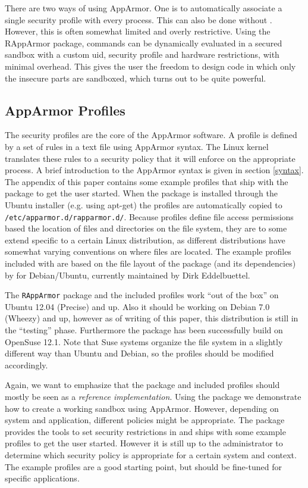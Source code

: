 \documentclass[article]{jss}
\begin{document}
There are two ways of using AppArmor. One is to automatically associate a
single security profile with every  process. This can also be done
without . However, this is often somewhat limited and overly
restrictive. Using the RAppArmor package,  commands can be
dynamically evaluated in a secured sandbox with a custom uid, security profile and hardware restrictions,
with minimal overhead. This gives the user the freedom to design code in which
only the insecure parts are sandboxed, which turns out to be quite powerful.

\subsection{AppArmor Profiles}

The security profiles are the core of the AppArmor software. A profile is
defined by a set of rules in a text file using AppArmor syntax. The Linux
kernel translates these rules to a security policy that it will enforce on the
appropriate process. A brief introduction to the AppArmor syntax is given in
section \ref{syntax}. The appendix of this paper contains some example
profiles that ship with the  package to get the user started.
When the package is installed through the Ubuntu installer (e.g. using apt-get)
the profiles are automatically copied to \texttt{/etc/apparmor.d/rapparmor.d/}.
Because profiles define file access permissions based the location of files and
directories on the file system, they are to some extend specific to a certain
Linux distribution, as different distributions have somewhat varying conventions
on where files are located. The example profiles included with 
are based on the file layout of the  package (and its dependencies)
by \cite{batesusing} for Debian/Ubuntu, currently maintained by Dirk Eddelbuettel.

The \texttt{RAppArmor} package and the included profiles work ``out of the
box'' on Ubuntu 12.04 (Precise) and up. Also it should be working on Debian
7.0 (Wheezy) and up, however as of writing of this paper, this distribution is
still in the ``testing'' phase. Furthermore the package has been successfully
build on OpenSuse 12.1. Note that Suse systems organize the file system in a
slightly different way than Ubuntu and Debian, so the profiles should be
modified accordingly. 

Again, we want to emphasize that the package and included
profiles should mostly be seen as a \emph{reference implementation}. Using the
package we demonstrate how to create a working sandbox using AppArmor. However,
depending on system and application, different policies might be appropriate.
The  package provides the tools to set security restrictions in
 and ships with some example profiles to get the user started.
However it is still up to the administrator to determine which security
policy is appropriate for a certain system and context. The example
profiles are a good starting point, but should be fine-tuned for specific
applications.
\end{document}
